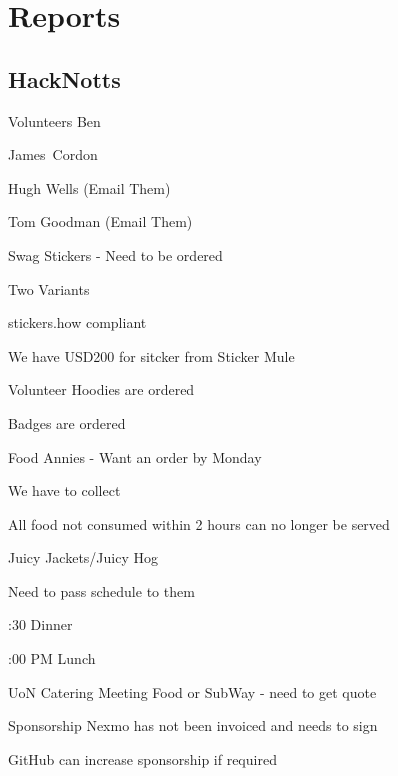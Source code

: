 \documentclass[11pt,hacksoc]{meetingmins}
\begin{document}
\maketitle

\section{Reports}

\subsection{HackNotts}
\begin{hiddensubitems}
	\item
	Volunteers
		\subitem
		Ben
		
		\subitem
		James~Cordon
		
		\subitem
		Hugh Wells (Email Them)
		
		\subitem
		Tom Goodman (Email Them)
		
	\item
	Swag
		\subitem
		Stickers - Need to be ordered
		
			\subsubitem
			Two Variants
			
			\subsubitem
			stickers.how compliant
			
			\subsubitem
			We have USD200 for sitcker from Sticker Mule
			
		\subitem
		Volunteer Hoodies are ordered
		
		\subitem
		Badges are ordered
		
	\item
	Food
		\subitem
		Annies - Want an order by Monday
			
			\subsubitem
			We have to collect
			
			\subsubitem
			All food not consumed within 2 hours can no longer be served
			
		\subitem
		Juicy Jackets/Juicy Hog
			
			\subsubitem
			Need to pass schedule to them
			
			:30 Dinner
			
			:00 PM Lunch
			
		\subitem
		UoN Catering Meeting Food or SubWay - need to get quote
	
	\item
	Sponsorship
		\subitem
		Nexmo has not been invoiced and needs to sign
		
		\subitem
		GitHub can increase sponsorship if required
		

\end{hiddensubitems}
\end{document}
